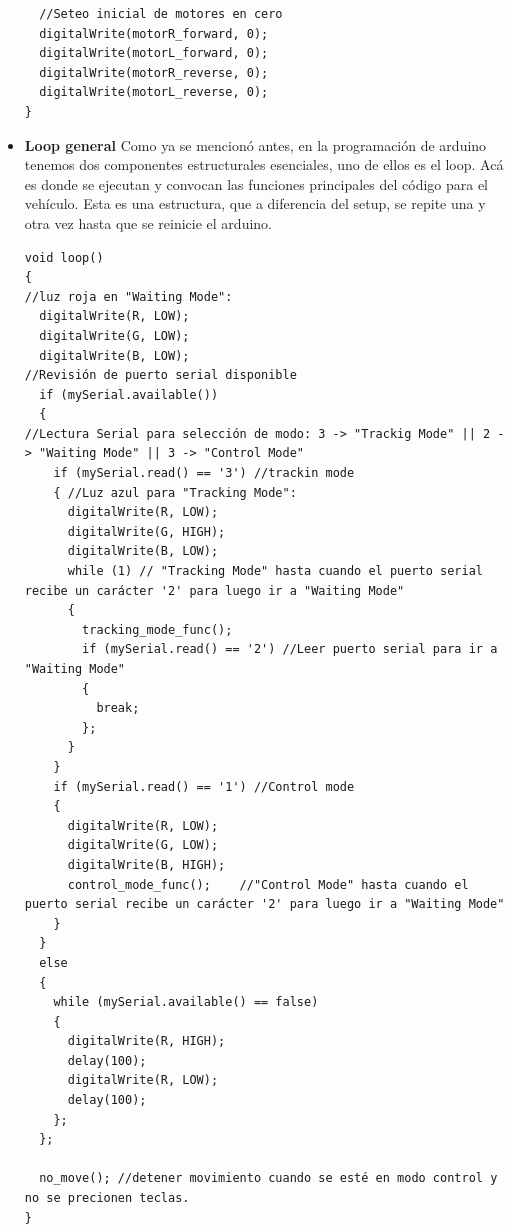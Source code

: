 \begin{itemize}
\begin{lstlisting}
  //Seteo inicial de motores en cero
  digitalWrite(motorR_forward, 0);
  digitalWrite(motorL_forward, 0);
  digitalWrite(motorR_reverse, 0);
  digitalWrite(motorL_reverse, 0);
}
\end{lstlisting}
    \item \textbf{ Loop general} Como ya se mencionó antes, en la programación de arduino tenemos dos componentes estructurales esenciales, uno de ellos es el loop. Acá es donde se ejecutan y convocan las funciones principales del código para el vehículo. Esta es una estructura, que a diferencia del setup, se repite una y otra vez hasta que se reinicie el arduino. 
    \begin{lstlisting}
void loop()
{   
//luz roja en "Waiting Mode":
  digitalWrite(R, LOW);
  digitalWrite(G, LOW);
  digitalWrite(B, LOW);
//Revisión de puerto serial disponible
  if (mySerial.available())
  {
//Lectura Serial para selección de modo: 3 -> "Trackig Mode" || 2 -> "Waiting Mode" || 3 -> "Control Mode"
    if (mySerial.read() == '3') //trackin mode
    { //Luz azul para "Tracking Mode":
      digitalWrite(R, LOW);
      digitalWrite(G, HIGH);
      digitalWrite(B, LOW);
      while (1) // "Tracking Mode" hasta cuando el puerto serial recibe un carácter '2' para luego ir a "Waiting Mode"
      {
        tracking_mode_func();
        if (mySerial.read() == '2') //Leer puerto serial para ir a "Waiting Mode"
        {
          break;
        };
      }
    }
    if (mySerial.read() == '1') //Control mode
    { 
      digitalWrite(R, LOW);
      digitalWrite(G, LOW);
      digitalWrite(B, HIGH);
      control_mode_func();    //"Control Mode" hasta cuando el puerto serial recibe un carácter '2' para luego ir a "Waiting Mode"
    }
  }
  else
  {
    while (mySerial.available() == false)
    {
      digitalWrite(R, HIGH);
      delay(100);
      digitalWrite(R, LOW);
      delay(100);
    };
  };

  no_move(); //detener movimiento cuando se esté en modo control y no se precionen teclas.
}
\end{lstlisting}


\end{itemize}
